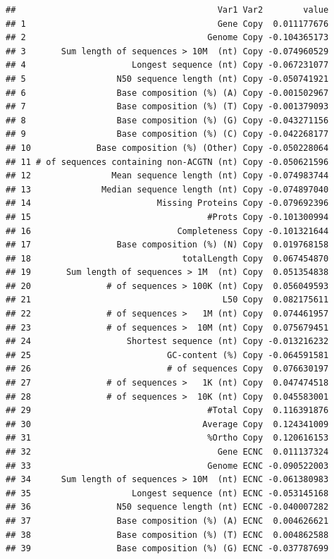 \documentclass[10pt,letterpaper]{article}
\begin{document}
\begin{verbatim}
##                                        Var1 Var2        value
## 1                                      Gene Copy  0.011177676
## 2                                    Genome Copy -0.104365173
## 3       Sum length of sequences > 10M  (nt) Copy -0.074960529
## 4                     Longest sequence (nt) Copy -0.067231077
## 5                  N50 sequence length (nt) Copy -0.050741921
## 6                  Base composition (%) (A) Copy -0.001502967
## 7                  Base composition (%) (T) Copy -0.001379093
## 8                  Base composition (%) (G) Copy -0.043271156
## 9                  Base composition (%) (C) Copy -0.042268177
## 10             Base composition (%) (Other) Copy -0.050228064
## 11 # of sequences containing non-ACGTN (nt) Copy -0.050621596
## 12                Mean sequence length (nt) Copy -0.074983744
## 13              Median sequence length (nt) Copy -0.074897040
## 14                         Missing Proteins Copy -0.079692396
## 15                                   #Prots Copy -0.101300994
## 16                             Completeness Copy -0.101321644
## 17                 Base composition (%) (N) Copy  0.019768158
## 18                              totalLength Copy  0.067454870
## 19       Sum length of sequences > 1M  (nt) Copy  0.051354838
## 20               # of sequences > 100K (nt) Copy  0.056049593
## 21                                      L50 Copy  0.082175611
## 22               # of sequences >   1M (nt) Copy  0.074461957
## 23               # of sequences >  10M (nt) Copy  0.075679451
## 24                   Shortest sequence (nt) Copy -0.013216232
## 25                           GC-content (%) Copy -0.064591581
## 26                           # of sequences Copy  0.076630197
## 27               # of sequences >   1K (nt) Copy  0.047474518
## 28               # of sequences >  10K (nt) Copy  0.045583001
## 29                                   #Total Copy  0.116391876
## 30                                  Average Copy  0.124341009
## 31                                   %Ortho Copy  0.120616153
## 32                                     Gene ECNC  0.011137324
## 33                                   Genome ECNC -0.090522003
## 34      Sum length of sequences > 10M  (nt) ECNC -0.061380983
## 35                    Longest sequence (nt) ECNC -0.053145168
## 36                 N50 sequence length (nt) ECNC -0.040007282
## 37                 Base composition (%) (A) ECNC  0.004626621
## 38                 Base composition (%) (T) ECNC  0.004862588
## 39                 Base composition (%) (G) ECNC -0.037787699

\end{verbatim}
\end{document}
